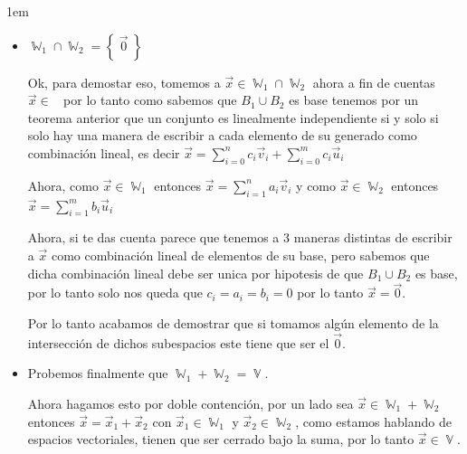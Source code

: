 \documentclass[12pt, fleqn]{report}                             %
\newenvironment{SmallIndentation}[1][0.75em]                    %
        {\begin{adjustwidth}{#1}{}\begin{footnotesize}}             %
        {\end{footnotesize}\end{adjustwidth}}                       %
\theoremstyle{break}                                            %
\DeclareMathOperator \GenericField {\mathbb{F}}                 %
\DeclareMathOperator \VectorSet    {\mathbb{V}}                 %
\DeclareMathOperator \SubVectorSet {\mathbb{W}}                 %
\DeclareMathOperator \VectorSpace  {\VectorSet_{\GenericField}} %
\newcommand{\Set}[1]    {\left\{ \; #1 \; \right\}}             %
\begin{document}
\begin{itemize}
\begin{SmallIndentation}[1em]
\begin{itemize}
                                \item
                                    $\SubVectorSet_1 \cap \SubVectorSet_2 = \Set{\vec 0}$

                                    Ok, para demostar eso, tomemos a $\vec x \in \SubVectorSet_1 \cap \SubVectorSet_2$
                                    ahora a fin de cuentas $\vec x \in \VectorSpace$ por lo tanto como sabemos que $B_1 \cup B_2$
                                    es base tenemos por un teorema anterior que un conjunto es linealmente independiente si y solo si solo hay
                                    una manera de escribir a cada elemento de su generado como combinación lineal, es
                                    decir $\vec x = \sum_{i=0}^{n} c_i \vec v_i + \sum_{i=0}^{m} c_i \vec u_i$

                                    Ahora, como $\vec x \in \SubVectorSet_1$ entonces $\vec x = \sum_{i=1}^n a_i \vec v_i$
                                    y como $\vec x \in \SubVectorSet_2$ entonces $\vec x = \sum_{i=1}^m b_i \vec u_i$

                                    Ahora, si te das cuenta parece que tenemos a 3 maneras distintas de escribir a $\vec x$ como
                                    combinación lineal de elementos de su base, pero sabemos que dicha combinación lineal debe ser unica por
                                    hipotesis de que $B_1 \cup B_2$ es base, por lo tanto solo nos queda que $c_i = a_i = b_i = 0$
                                    por lo tanto $\vec x = \vec 0$.

                                    Por lo tanto acabamos de demostrar que si tomamos algún elemento de la intersección de dichos subespacios
                                    este tiene que ser el $\vec 0$.

                                \item
                                    Probemos finalmente que $\SubVectorSet_1 + \SubVectorSet_2 = \VectorSet$.

                                    Ahora hagamos esto por doble contención, por un lado sea
                                    $\vec x \in \SubVectorSet_1 + \SubVectorSet_2$ entonces
                                    $\vec x = \vec x_1 + \vec x_2$ con $\vec x_1 \in \SubVectorSet_1$ y $\vec x_2 \in \SubVectorSet_2$,
                                    como estamos hablando de espacios vectoriales, tienen que ser cerrado bajo la suma, por lo tanto
                                    $\vec x \in \VectorSet$.


\end{itemize}
\end{SmallIndentation}
\end{itemize}
\end{document}
